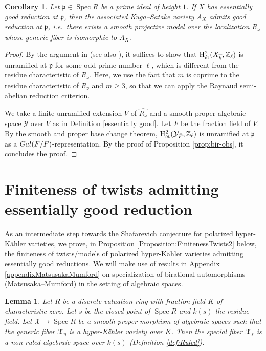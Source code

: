 \documentclass[11pt,reqno,oneside]{amsart}
\numberwithin{equation}{section}
\newtheorem{corollary}[theorem]{Corollary}
\newtheorem{lemma}[theorem]{Lemma}
\theoremstyle{definition}
\DeclareMathOperator{\Spec}{Spec}
\newcommand{\Gal}{{\rm Gal}}
\DeclareMathOperator{\et}{\Acute{e}t}
\newcommand\rH{\mathrm{H}}
\newcommand{\ZZ}{\mathbb{Z}}
\newcommand{\p}{\mathfrak{p}}
\begin{document}
\begin{corollary}\label{cor:kugasatakegoodreduction}
Let $\p \in \Spec R$ be a prime ideal of height $1$.
If $X$ has essentially good reduction at $\p$,
then the associated Kuga--Satake variety $A_X$ admits good reduction at $\p$, i.e.\, there exists a smooth projective model over the localization $R_{\p}$ whose generic fiber is isomorphic to $A_{X}$.
\label{lemKSgood}
\end{corollary}
\begin{proof}
By the argument in \cite[Lemma 9.3.1]{A96} (see also \cite[Proposition 4.2.4]{Takamatsu2020c}),
it suffices to show that
$
\rH^{2}_{\et} (X_{\overline{k}}, \ZZ_{\ell})
$
is unramified at $\p$ for some odd prime number $\ell$, which is different from the residue characteristic of $R_{\p}$.  Here, we use the fact that $m$ is coprime to the residue characteristic of $R_{\p}$ and $m\geq 3$, so that we can apply the Raynaud semi-abelian reduction criterion.

We take a finite unramified extension $V$ of $\widehat{R_{\p}}$ and a smooth proper algebraic space $\mathcal{Y}$ over $V$ as in Definition \ref{essentially good}. Let $F$ be the fraction field of $V$.
By the smooth and proper base change theorem, $\rH^{2}_{\et}(\mathcal{Y}_{\bar{F}}, \ZZ_{\ell})$ is unramified at $\p$ as a $\Gal(\bar{F}/F)$-representation.
By the proof of Proposition \ref{prop:bir-obs}, it concludes the proof.

\end{proof}






\section{Finiteness of twists admitting essentially good reduction}
\label{sectionMatsusakaMumford}


\label{sectiontwists}
As an intermediate step towards the Shafarevich conjecture for polarized hyper-Kähler varieties, we prove, in Proposition \ref{Proposition:FinitenessTwists2} below, the finiteness of twists/models of polarized hyper-Kähler varieties admitting essentially good reductions.
We will make use of results in Appendix \ref{appendixMatsusakaMumford} on specialization of birational automorphisms (Matsusaka--Mumford) in the setting of algebraic spaces.

\begin{lemma}
\label{ruled}
Let $R$ be a discrete valuation ring with fraction field $K$ of characteristic zero.
Let $s$ be the closed point of $\Spec R$ and $k(s)$ the residue field.
Let $\mathcal{X} \rightarrow \Spec R$ be a smooth proper morphism of algebraic spaces such that the generic fiber $\mathcal{X}_{\eta}$ is a hyper-Kähler variety over $K$.
Then the special fiber $\mathcal{X}_{s}$ is a non-ruled algebraic space over $k(s)$ (Definition \ref{def:Ruled}).
\end{lemma}
\end{document}
